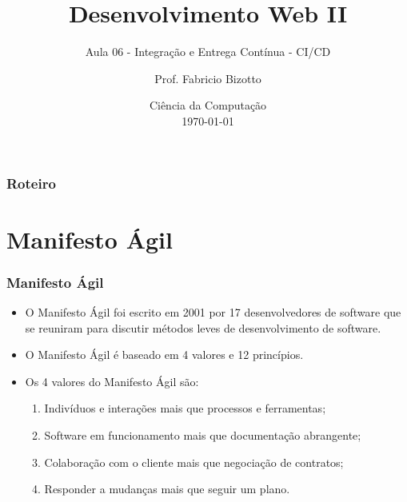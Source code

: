 \documentclass[
	9pt, %
	t, %
]{beamer}
\title[DesWebII]{Desenvolvimento Web II} %
\subtitle{Aula 06 - Integração e Entrega Contínua - CI/CD} %
\author[Fabricio Bizotto]{Prof. Fabricio Bizotto} %
\institute[IFC]{Instituto Federal Catarinense \\ \smallskip \textit{fabricio.bizotto@ifc.edu.br}} %
\date[\today]{Ciência da Computação \\ \today} %
\begin{document}

\begin{frame}
	\titlepage %
\end{frame}


\begin{frame}
	\frametitle{Roteiro} %
	
	\tableofcontents %
\end{frame}


\section{Manifesto Ágil}


\begin{frame}
	\frametitle{Manifesto Ágil}
	\begin{itemize}
		\item O Manifesto Ágil foi escrito em 2001 por 17 desenvolvedores de software que se reuniram para discutir métodos leves de desenvolvimento de software.
		\item O Manifesto Ágil é baseado em 4 valores e 12 princípios.
		\item Os 4 valores do Manifesto Ágil são:
		\begin{enumerate}
			\item Indivíduos e interações mais que processos e ferramentas;
			\item Software em funcionamento mais que documentação abrangente;
			\item Colaboração com o cliente mais que negociação de contratos;
			\item Responder a mudanças mais que seguir um plano.
		\end{enumerate}
	\end{itemize}
\end{frame}
\end{document}
